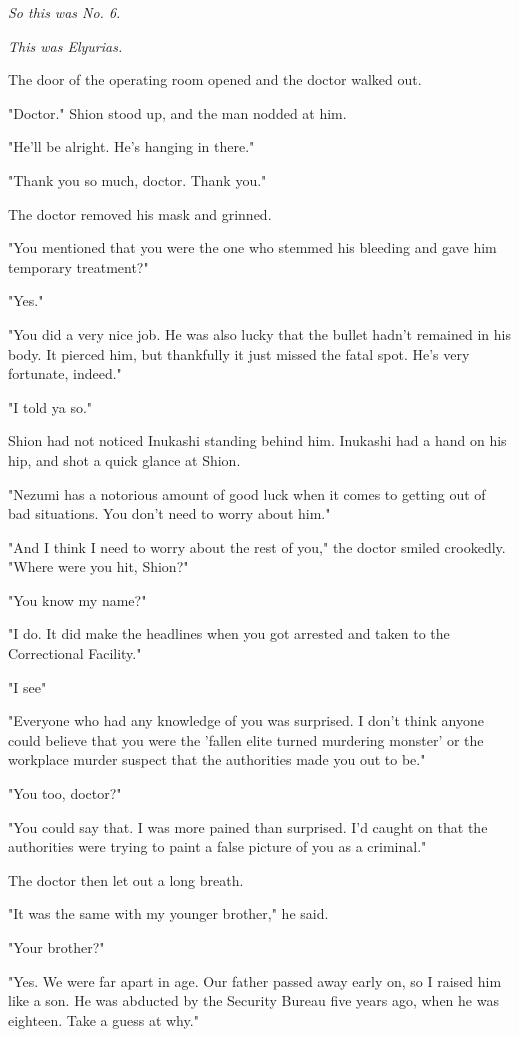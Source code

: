 \emph{So this was No. 6.}

\emph{This was Elyurias.}

The door of the operating room opened and the doctor walked out.

"Doctor." Shion stood up, and the man nodded at him.

"He'll be alright. He's hanging in there."

"Thank you so much, doctor. Thank you."

The doctor removed his mask and grinned.

"You mentioned that you were the one who stemmed his bleeding and gave
him temporary treatment?"

"Yes."

"You did a very nice job. He was also lucky that the bullet hadn't
remained in his body. It pierced him, but thankfully it just missed the
fatal spot. He's very fortunate, indeed."

"I told ya so."

Shion had not noticed Inukashi standing behind him. Inukashi had a hand
on his hip, and shot a quick glance at Shion.

"Nezumi has a notorious amount of good luck when it comes to getting out
of bad situations. You don't need to worry about him."

"And I think I need to worry about the rest of you," the doctor smiled
crookedly. "Where were you hit, Shion?"

"You know my name?"

"I do. It did make the headlines when you got arrested and taken to the
Correctional Facility."

"I see\el "

"Everyone who had any knowledge of you was surprised. I don't think
anyone could believe that you were the 'fallen elite turned murdering
monster' or the workplace murder suspect that the authorities made you
out to be."

"You too, doctor?"

"You could say that. I was more pained than surprised. I'd caught on
that the authorities were trying to paint a false picture of you as a
criminal."

The doctor then let out a long breath.

"It was the same with my younger brother," he said.

\mybreak

"Your brother?"

"Yes. We were far apart in age. Our father passed away early on, so I
raised him like a son. He was abducted by the Security Bureau five years
ago, when he was eighteen. Take a guess at why."

